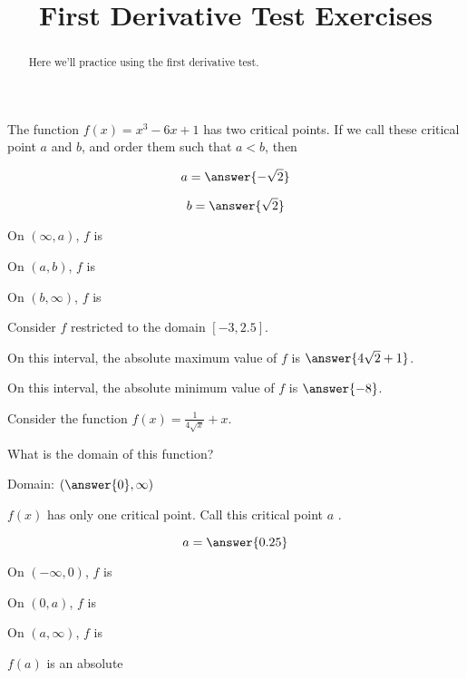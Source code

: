 \documentclass[handout]{ximera}
\title{First Derivative Test Exercises}
\begin{document}
\begin{abstract}
  Here we'll practice using the first derivative test.
\end{abstract}
\maketitle

\begin{exercise}
The function $f(x) = x^3-6x+1$ has two critical points.  If we call these critical point $a$ and $b$, and order them such that $a < b$, then

$$
a = \answer{-\sqrt{2}}
$$

$$
b=\answer{\sqrt{2}}
$$

On $(\infty,a)$, $f$ is 

On $(a,b)$, $f$ is 

On $(b,\infty)$, $f$ is 


Consider $f$ restricted to the domain $[-3,2.5]$.

On this interval, the absolute maximum value of $f$ is $\answer{4\sqrt{2}+1}$.

On this interval, the absolute minimum value of $f$ is $\answer{-8}$.

\end{exercise}

\begin{exercise}
Consider the function $f(x) =\displaystyle\frac{1}{4\sqrt{x}}+x$.

What is the domain of this function? 

Domain: $ (\answer{0}, \infty)$

$f(x)$ has only one critical point.  Call this critical point $a$ .

$$
a = \answer{0.25}
$$

On $(-\infty,0)$, $f$ is 

On $(0,a)$, $f$ is 

On $(a,\infty)$, $f$ is 

$f(a)$ is an absolute 

\end{exercise}
\end{document}
